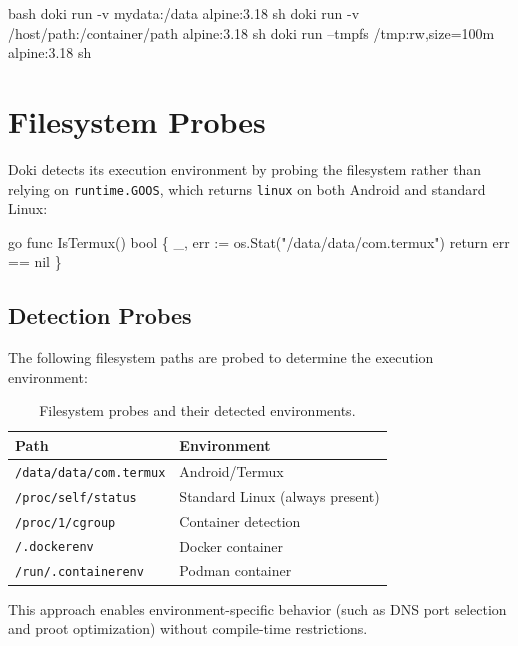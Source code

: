 \begin{codebox}[title={Volume mount syntax}]{bash}
doki run -v mydata:/data alpine:3.18 sh
doki run -v /host/path:/container/path alpine:3.18 sh
doki run --tmpfs /tmp:rw,size=100m alpine:3.18 sh
\end{codebox}

\section{Filesystem Probes}
\label{sec:filesystem-probes}

Doki detects its execution environment by probing the filesystem
rather than relying on \texttt{runtime.GOOS}, which returns
\texttt{linux} on both Android and standard Linux:

\begin{codebox}[title={Environment detection logic}]{go}
func IsTermux() bool \{
    \_, err := os.Stat("/data/data/com.termux")
    return err == nil
\}
\end{codebox}

\subsection{Detection Probes}
\label{sec:detection-probes}

The following filesystem paths are probed to determine the execution
environment:

\begin{table}[htbp]
  \centering
  \caption{Filesystem probes and their detected environments.}
  \label{tab:fs-probes}
  \begin{tabularx}{\textwidth}{l X}
    \toprule
    \textbf{Path} & \textbf{Environment} \\
    \midrule
    \texttt{/data/data/com.termux} & Android/Termux \\
    \texttt{/proc/self/status}     & Standard Linux (always present) \\
    \texttt{/proc/1/cgroup}        & Container detection \\
    \texttt{/.dockerenv}           & Docker container \\
    \texttt{/run/.containerenv}    & Podman container \\
    \bottomrule
  \end{tabularx}
\end{table}

This approach enables environment-specific behavior (such as DNS port
selection and proot optimization) without compile-time restrictions.
